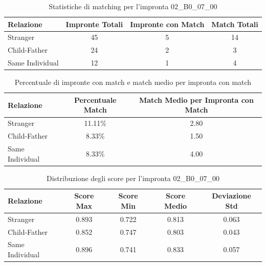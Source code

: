 \begin{table}[htbp]
\centering
\caption{Statistiche di matching per l'impronta 02\_B0\_07\_00}
\label{tab:results_02_B0_07_00}
\begin{tabular}{|l|c|c|c|}
\hline
\textbf{Relazione} & \textbf{Impronte Totali} & \textbf{Impronte con Match} & \textbf{Match Totali} \\
\hline
Stranger & 45 & 5 & 14 \\
\hline
Child-Father & 24 & 2 & 3 \\
\hline
Same Individual & 12 & 1 & 4 \\
\hline
\end{tabular}
\end{table}


\begin{table}[htbp]
\centering
\caption{Percentuale di impronte con match e match medio per impronta con match}
\label{tab:match_percentage_02_B0_07_00}
\begin{tabular}{|l|c|c|}
\hline
\textbf{Relazione} & \textbf{Percentuale Match} & \textbf{Match Medio per Impronta con Match} \\
\hline
Stranger & 11.11\% & 2.80 \\
\hline
Child-Father & 8.33\% & 1.50 \\
\hline
Same Individual & 8.33\% & 4.00 \\
\hline
\end{tabular}
\end{table}


\begin{table}[htbp]
\centering
\caption{Distribuzione degli score per l'impronta 02\_B0\_07\_00}
\label{tab:scores_02_B0_07_00}
\begin{tabular}{|l|c|c|c|c|}
\hline
\textbf{Relazione} & \textbf{Score Max} & \textbf{Score Min} & \textbf{Score Medio} & \textbf{Deviazione Std} \\
\hline
Stranger & 0.893 & 0.722 & 0.813 & 0.063 \\
\hline
Child-Father & 0.852 & 0.747 & 0.803 & 0.043 \\
\hline
Same Individual & 0.896 & 0.741 & 0.833 & 0.057 \\
\hline
\end{tabular}
\end{table}

